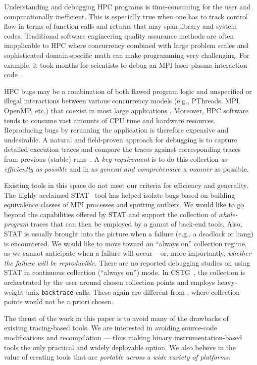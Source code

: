 Understanding and debugging HPC programs
is time-consuming for the user and computationally inefficient.
%
This is especially true when one has to
track control flow in terms of function calls and returns that may
span library and system codes.
%
Traditional software engineering quality assurance methods are
often inapplicable to HPC where concurrency combined with
large problem scales and sophisticated domain-specific math can make programming
very challenging.
%
For example, it took months for scientists to debug an MPI laser-plasma interaction
code~\cite{hpcdoe}.


HPC bugs may be a combination of both flawed program logic and unspecified or illegal interactions between various concurrency models (e.g., PThreads, MPI, OpenMP, etc.) that coexist in most large applications \cite{hpcdoe}. Moreover, HPC software tends to consume vast amounts of CPU time and hardware resources. Reproducing bugs by rerunning the application is therefore expensive and undesirable.
A natural and field-proven approach for debugging is to capture detailed execution traces and compare the traces against corresponding traces from previous (stable) runs~\cite{stat,cstg}.
%
A {\em key requirement} is to do this collection {\em as efficiently as possible}
and in {\em as general and comprehensive a manner} as possible.


Existing tools in this space
do not meet our criteria for efficiency and generality.
%
The highly acclaimed STAT~\cite{stat} tool has helped isolate
bugs based on building equivalence classes of MPI processes and spotting
outliers.
%
We would like to go beyond the capabilities offered by STAT and support
the collection of {\em whole-program} traces that can then be employed
by a  gamut of back-end tools.
%
Also, STAT is usually brought into the picture
when a failure (e.g., a deadlock or hang) is encountered. We would like
to move toward an ``always on'' collection regime, as we cannot anticipate
when a failure will occur -- or, more importantly, {\em whether the failure
will be reproducible.}
%
There are no reported debugging studies on using STAT in
continuous collection (``always on'') mode.
%
In CSTG~\cite{cstg}, the collection is orchestrated by the
user around chosen collection points and employs heavy-weight
unix {\tt backtrace} calls.
%
These again are different from \parlot, where collection points would not be a priori chosen.


The thrust of the work in this paper is to avoid many of the drawbacks of existing
tracing-based tools.
%
We are interested in avoiding
source-code modifications and recompilation --- thus making binary
instrumentation-based tools the only practical and widely deployable option.
%
We also believe in the value
of creating tools that are {\em portable across a
wide variety of platforms}.
%

